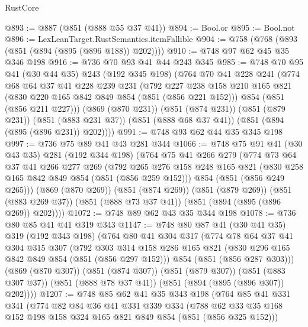 \begin{lexlean}{RustCore}
\begin{coremodule}
@893 := @887 (@851 (@888 @55 @37 @41))
@894 := Bool.or
@895 := Bool.not
@896 := LexLeanTarget.RustSemantics.itemFallible
@904 := @758 (@768 (@893 (@851 (@894 (@895 (@896 @188)) @202))))
@910 := @748 @97 @62 @45 @35 @346 @198
@916 := @736 @70 @93 @41 @44 @243 @345
@985 := @748
    @70
    @95
    @41
    (@30 @44 @35)
    @243
    (@192 @345 @198)
    (@764
      @70
      @41
      @228
      @241
      (@774
        @68
        @64
        @37
        @41
        @228
        @239
        @231
        (@792
          @227
          @238
          @158
          @210
          @165
          @821
          (@830 @220 @165 @842 @849 @854 (@851 (@856 @221 @152)))
          @854
          (@851 (@856 @211 @227)))
        (@869 (@870 @231))
        (@851 (@874 @231))
        (@851 (@879 @231))
        (@851 (@883 @231 @37))
        (@851 (@888 @68 @37 @41))
        (@851 (@894 (@895 (@896 @231)) @202))))
@991 := @748 @93 @62 @44 @35 @345 @198
@997 := @736 @75 @89 @41 @43 @281 @344
@1066 := @748
    @75
    @91
    @41
    (@30 @43 @35)
    @281
    (@192 @344 @198)
    (@764
      @75
      @41
      @266
      @279
      (@774
        @73
        @64
        @37
        @41
        @266
        @277
        @269
        (@792
          @265
          @276
          @158
          @248
          @165
          @821
          (@830 @258 @165 @842 @849 @854 (@851 (@856 @259 @152)))
          @854
          (@851 (@856 @249 @265)))
        (@869 (@870 @269))
        (@851 (@874 @269))
        (@851 (@879 @269))
        (@851 (@883 @269 @37))
        (@851 (@888 @73 @37 @41))
        (@851 (@894 (@895 (@896 @269)) @202))))
@1072 := @748 @89 @62 @43 @35 @344 @198
@1078 := @736 @80 @85 @41 @41 @319 @343
@1147 := @748
    @80
    @87
    @41
    (@30 @41 @35)
    @319
    (@192 @343 @198)
    (@764
      @80
      @41
      @304
      @317
      (@774
        @78
        @64
        @37
        @41
        @304
        @315
        @307
        (@792
          @303
          @314
          @158
          @286
          @165
          @821
          (@830 @296 @165 @842 @849 @854 (@851 (@856 @297 @152)))
          @854
          (@851 (@856 @287 @303)))
        (@869 (@870 @307))
        (@851 (@874 @307))
        (@851 (@879 @307))
        (@851 (@883 @307 @37))
        (@851 (@888 @78 @37 @41))
        (@851 (@894 (@895 (@896 @307)) @202))))
@1207 := @748
    @85
    @62
    @41
    @35
    @343
    @198
    (@764
      @85
      @41
      @331
      @341
      (@774
        @82
        @84
        @36
        @41
        @331
        @339
        @334
        (@788 @62 @33 @35 @168 @152 @198 @158 @324 @165 @821 @849 @854 (@851 (@856 @325 @152)))

\end{coremodule}
\end{lexlean}
